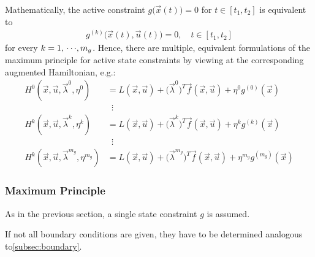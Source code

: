 				Mathematically, the active constraint \( g\big(\vec{x}(t)\big) = 0 \) for \( t \in [t_1, t_2] \) is equivalent to
				\begin{align*}
					g^{(k)}\big(\vec{x}(t), \vec{u}(t)\big) = 0,\quad t \in [t_1, t_2]
				\end{align*}
				for every \( k = 1,\,\cdots\!,m_g \). Hence, there are multiple, equivalent formulations of the maximum principle for active state constraints by viewing at the corresponding augmented Hamiltonian, e.g.:
				\begin{align*}
					H^0(\vec{x}, \vec{u}, \vec{\lambda}^0, \eta^0) &= L(\vec{x}, \vec{u}) + \big(\vec{\lambda}^0\big)^T \vec{f}(\vec{x}, \vec{u}) + \eta^0 g^{(0)}(\vec{x}) \\
					&\,\,\,\vdots \\
					H^k(\vec{x}, \vec{u}, \vec{\lambda}^k, \eta^k) &= L(\vec{x}, \vec{u}) + \big(\vec{\lambda}^k\big)^T \vec{f}(\vec{x}, \vec{u}) + \eta^k g^{(k)}(\vec{x}) \\
					&\,\,\,\vdots \\
					H^k(\vec{x}, \vec{u}, \vec{\lambda}^{m_g}, \eta^{m_g}) &= L(\vec{x}, \vec{u}) + \big(\vec{\lambda}^{m_g}\big)^T \vec{f}(\vec{x}, \vec{u}) + \eta^{m_g} g^{(m_g)}(\vec{x})
				\end{align*}

			\subsubsection{Maximum Principle}
				As in the previous section, a single state constraint \(g\) is assumed.

				If not all boundary conditions are given, they have to be determined analogous to\autoref{subsec:boundary}.

